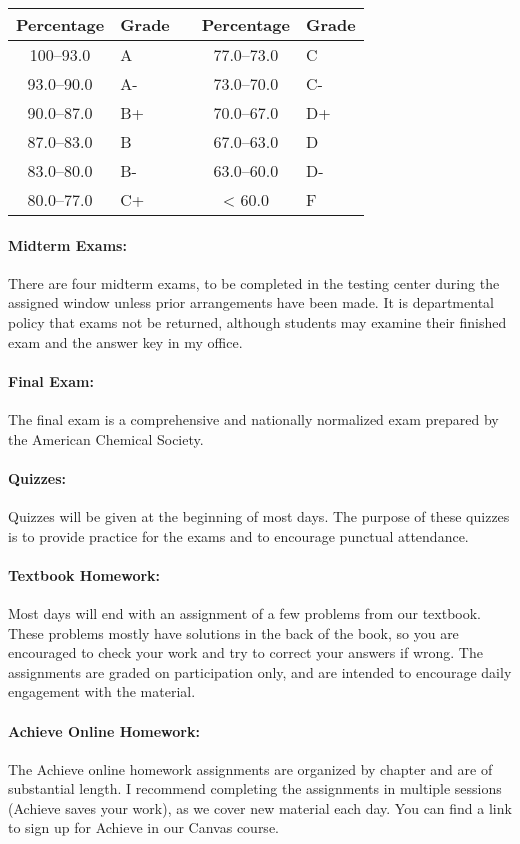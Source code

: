 \documentclass[12pt, letterpaper]{article}
\begin{document}
\begin{tabular}{cl|c|cl}
	Percentage & Grade &  & Percentage & Grade \\ \midrule
	100--93.0 & A     &  &  77.0--73.0 & C     \\
	93.0--90.0 & A-    &  &  73.0--70.0 & C-    \\
	90.0--87.0 & B+    &  &  70.0--67.0 & D+    \\
	87.0--83.0 & B     &  &  67.0--63.0 & D     \\
	83.0--80.0 & B-    &  &  63.0--60.0 & D-    \\
	80.0--77.0 & C+    &  &     < 60.0 & F
\end{tabular}
\paragraph{Midterm Exams:}
There are four midterm exams, to be completed in the testing center during the assigned window unless prior arrangements have been made. It is departmental policy that exams not be returned, although students may examine their finished exam and the answer key in my office.

\paragraph{Final Exam:}
The final exam is a comprehensive and nationally normalized exam prepared by the American Chemical Society.

\paragraph{Quizzes:}
Quizzes will be given at the beginning of most days. The purpose of these quizzes is to provide practice for the exams and to encourage punctual attendance.

\paragraph{Textbook Homework:}
Most days will end with an assignment of a few problems from our textbook. These problems mostly have solutions in the back of the book, so you are encouraged to check your work and try to correct your answers if wrong. The assignments are graded on participation only, and are intended to encourage daily engagement with the material.

\paragraph{Achieve Online Homework:}
The Achieve online homework assignments are organized by chapter and are of substantial length. I recommend completing the assignments in multiple sessions (Achieve saves your work), as we cover new material each day. You can find a link to sign up for Achieve in our Canvas course.
\end{document}
